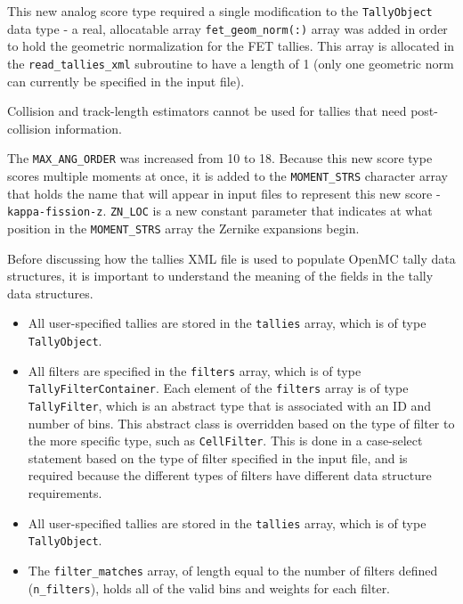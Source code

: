 \documentclass[10pt]{article}
\numberwithin{equation}{section} %
\begin{document}
This new analog score type required a single modification to the {\tt TallyObject} data type - a real, allocatable array {\tt fet\_geom\_norm(:)} array was added in order to hold the geometric normalization for the FET tallies. This array is allocated in the {\tt read\_tallies\_xml} subroutine to have a length of 1 (only one geometric norm can currently be specified in the input file). 

Collision and track-length estimators cannot be used for tallies that need post-collision information.

The {\tt MAX\_ANG\_ORDER} was increased from 10 to 18. Because this new score type scores multiple moments at once, it is added to the {\tt MOMENT\_STRS} character array that holds the name that will appear in input files to represent this new score - {\tt kappa-fission-z}. {\tt ZN\_LOC} is a new constant parameter that indicates at what position in the {\tt MOMENT\_STRS} array the Zernike expansions begin.

Before discussing how the tallies XML file is used to populate OpenMC tally data structures, it is important to understand the meaning of the fields in the tally data structures. 

\begin{itemize}
\item All user-specified tallies are stored in the {\tt tallies} array, which is of type {\tt TallyObject}.
\item All filters are specified in the {\tt filters} array, which is of type {\tt TallyFilterContainer}. Each element of the {\tt filters} array is of type {\tt TallyFilter}, which is an abstract type that is associated with an ID and number of bins. This abstract class is overridden based on the type of filter to the more specific type, such as {\tt CellFilter}. This is done in a case-select statement based on the type of filter specified in the input file, and is required because the different types of filters have different data structure requirements.
\end{itemize}

\begin{itemize}
\item All user-specified tallies are stored in the {\tt tallies} array, which is of type {\tt TallyObject}.
\item The {\tt filter\_matches} array, of length equal to the number of filters defined ({\tt n\_filters}), holds all of the valid bins and weights for each filter.
\end{itemize}
\end{document}
